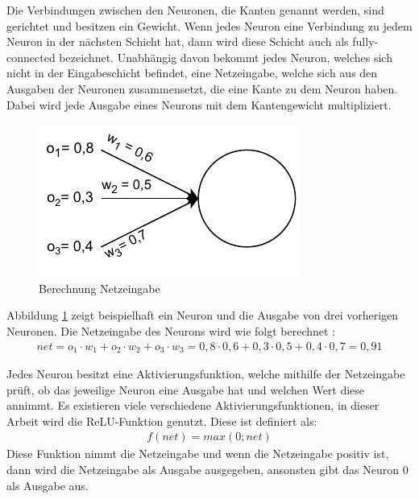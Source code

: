 Die Verbindungen zwischen den Neuronen, die Kanten genannt werden, sind gerichtet und besitzen ein Gewicht. Wenn jedes Neuron eine Verbindung zu jedem Neuron in der nächsten Schicht hat, 
dann wird diese Schicht auch als fully-connected bezeichnet. Unabhängig davon bekommt jedes Neuron, welches sich nicht in der Eingabeschicht befindet, eine Netzeingabe, 
welche sich aus den Ausgaben der Neuronen zusammensetzt, die eine Kante zu dem Neuron haben. Dabei wird jede Ausgabe eines Neurons mit dem Kantengewicht multipliziert.

\begin{figure}[H]
    \centering
    \includegraphics[width=\textwidth/2]{abbildungen/Aktivierungsfunktion.pdf}
    \caption{Berechnung Netzeingabe \cite[vgl. S.29]{NN}}
    \label{fig:Aktivierungsfunktion}
\end{figure}

Abbildung \ref*{fig:Aktivierungsfunktion} zeigt beispielhaft ein Neuron und die Ausgabe von drei vorherigen Neuronen. Die Netzeingabe des Neurons wird wie folgt berechnet \cite[S.29]{NN}:
\begin{align}
    net = o_{1} \cdot w_{1} + o_{2} \cdot w_{2} + o_{3} \cdot w_{3} = 0,8 \cdot 0,6 + 0,3 \cdot 0,5 + 0,4 \cdot 0,7 = 0,91
\end{align}

Jedes Neuron besitzt eine Aktivierungsfunktion, welche mithilfe der Netzeingabe prüft, ob das jeweilige Neuron eine Ausgabe hat und welchen Wert diese annimmt. Es existieren viele
verschiedene Aktivierungsfunktionen, in dieser Arbeit wird die \ac{ReLU}-Funktion genutzt. Diese ist definiert als:
\begin{align}
    f(net) = max(0; net)
\end{align}
Diese Funktion nimmt die Netzeingabe und wenn die Netzeingabe positiv ist, dann wird die Netzeingabe als Ausgabe ausgegeben, ansonsten gibt das Neuron 0 als Ausgabe aus.